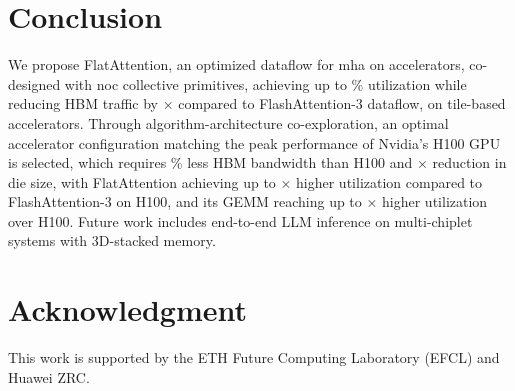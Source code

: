 \documentclass[conference]{IEEEtran}
\begin{document}
\section{Conclusion}

\vspace{-2mm}
We propose FlatAttention, an optimized dataflow for \gls{mha} on \arch accelerators, co-designed with \gls{noc} collective primitives, achieving up to \MaxUti\% utilization while reducing HBM traffic by \OptFlatHBMTraficSave× compared to FlashAttention-3 dataflow, on tile-based accelerators. 
Through algorithm-architecture co-exploration, an optimal accelerator configuration matching the peak performance of Nvidia's H100 GPU is selected, which requires \BWreducetoNV\% less HBM bandwidth than H100 and \DieSave× reduction in die size, with FlatAttention achieving up to \SUtoNV× higher utilization compared to FlashAttention-3 on H100,  and its GEMM reaching up to \GEMMSUtoNV× higher utilization over H100.
Future work includes end-to-end LLM inference on multi-chiplet systems with 3D-stacked memory.


\vspace{-2mm}
\section*{Acknowledgment}
This work is supported by the ETH Future Computing Laboratory (EFCL) and Huawei ZRC.



\end{document}
